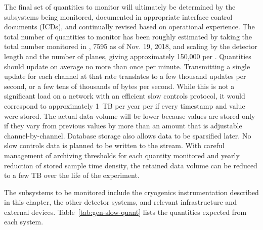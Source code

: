 The final set of quantities to monitor will ultimately be determined
by the subsystems being monitored, documented in
appropriate  interface control documents (ICDs), and continually revised based on operational
experience.  The total number of quantities to monitor has been roughly estimated by taking the total number monitored
in \cite{pdspdcs_proc}, 7595 as of Nov. 19, 2018, and scaling by the detector length and the number of planes, giving approximately 150,000 per .
Quantities should update on average no more than once per minute.
Transmitting a single update for each channel at that rate translates to a few thousand updates per second, or a few tens of thousands of bytes per second. While this is not a significant load on a network with an efficient slow controls protocol, it would correspond to approximately 1~TB per year per  if every timestamp and value were stored.
The actual data volume will be lower %
because values are stored only if they vary from previous values by more than an amount that is adjustable channel-by-channel.
Database storage also allows data to be sparsified later.
No slow controls data is planned to be written to the  stream.
With careful management of archiving thresholds for each quantity monitored and yearly reduction of stored sample time density, the retained data volume can be reduced to a few TB over the life of the experiment.

The subsystems
to be monitored include the  
cryogenics instrumentation
described in this chapter, the other detector systems, and relevant
infrastructure and external devices. Table~\ref{tab:gen-slow-quant}
lists the quantities expected from each system.

